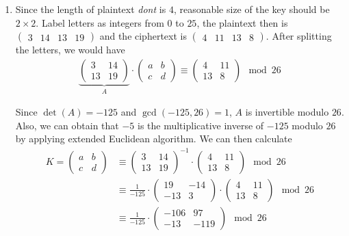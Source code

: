 \documentclass[11pt,a4paper]{article}
\begin{document}
\begin{enumerate}
	\item Since the length of plaintext \textit{dont} is $4$, reasonable size of the key should be $2\times 2$. Label letters as integers from $0$ to $25$, the plaintext then is $\begin{pmatrix} 3 & 14 & 13 & 19 \end{pmatrix}$ and the ciphertext is $\begin{pmatrix} 4 & 11 & 13 & 8 \end{pmatrix}$. After splitting the letters, we would have
	\begin{align*}
		\underbrace{\begin{pmatrix} 3 & 14 \\ 13 & 19 \end{pmatrix}}_{A} \cdot \begin{pmatrix} a & b \\ c & d \end{pmatrix} \equiv \begin{pmatrix} 4 & 11 \\ 13 & 8 \end{pmatrix} \mod 26 
	\end{align*}
	\par Since $\det(A)=-125$ and $\gcd(-125, 26)=1$, $A$ is invertible modulo $26$. Also, we can obtain that $-5$ is the multiplicative inverse of $-125$ modulo $26$ by applying extended Euclidean algorithm. We can then calculate
	\begin{align*}
		K = \begin{pmatrix} a & b \\ c & d \end{pmatrix} &\equiv \begin{pmatrix} 3 & 14 \\ 13 & 19 \end{pmatrix}^{-1} \cdot \begin{pmatrix} 4 & 11 \\ 13 & 8 \end{pmatrix} \mod 26 \\
		&\equiv \frac{1}{-125} \cdot \begin{pmatrix} 19 & -14 \\ -13 & 3 \end{pmatrix} \cdot \begin{pmatrix} 4 & 11 \\ 13 & 8 \end{pmatrix} \mod 26 \\
		&\equiv \frac{1}{-125} \cdot \begin{pmatrix} -106 & 97 \\ -13 & -119 \end{pmatrix} \mod 26 \\

\end{align*}
\end{enumerate}
\end{document}
